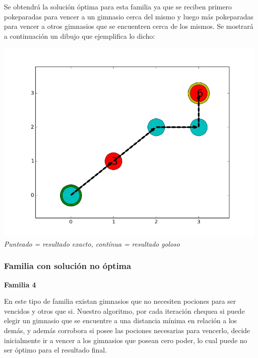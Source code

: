 Se obtendr\'a la soluci\'on \'optima para esta familia ya que se reciben primero pokeparadas para vencer a un gimnasio cerca del mismo y luego m\'as pokeparadas para vencer a otros gimnasios que se encuentren cerca de los mismos. Se mostrar\'a a continuaci\'on un dibujo que ejemplifica lo dicho:

\vspace*{0.3cm} \vspace*{0.3cm}
  \begin{center}
\includegraphics[scale=0.30]{./EJ2/optima.jpeg}
\\{\textit{Punteado = resultado exacto, contínua = resultado goloso}}
  \end{center}
  \vspace*{0.3cm}

\subsubsection*{Familia con soluci\'on no \'optima}

\begin{center}
\textbf{Familia 4}
\end{center}

En este tipo de familia existan gimnasios que no necesiten pociones para ser vencidos y otros que si. Nuestro algoritmo, por cada iteraci\'on chequea si puede elegir un gimnasio que se encuentre a una distancia m\'inima en relaci\'on a los demás, y adem\'as corrobora si posee las pociones necesarias para vencerlo, decide inicialmente ir a vencer a los gimnasios que posean cero poder, lo cual puede no ser \'optimo para el resultado final.


